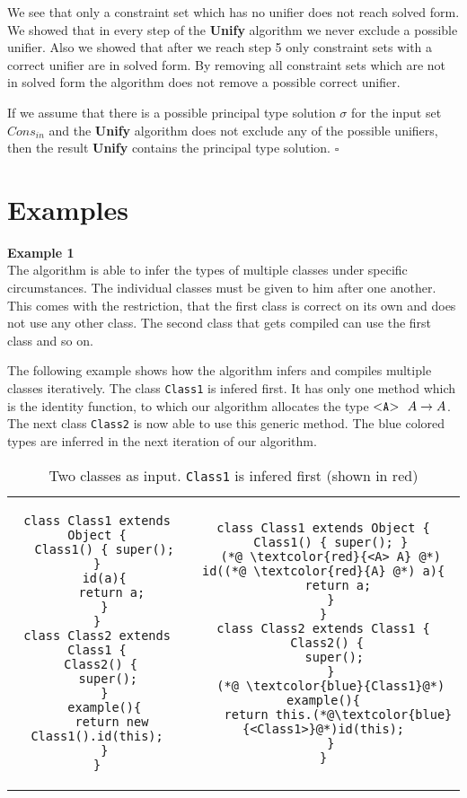 \documentclass[acmsmall,screen,review]{acmart}
\begin{document}
\begin{description}
We see that only a constraint set which has no unifier does not reach solved form.
We showed that in every step of the \textbf{Unify} algorithm we never exclude a possible unifier.
Also we showed that after we reach step 5 only constraint sets with a correct unifier are in solved form.
By removing all constraint sets which are not in solved form the algorithm does not
remove a possible correct unifier.

If we assume that there is a possible principal type solution $\sigma$ for the input set $Cons_{in}$
and the \textbf{Unify} algorithm does not exclude any of the possible unifiers,
then the result \textbf{Unify} contains the principal type solution.
\hfill $\square$
\end{description}

\section{Examples}

\textbf{Example 1}\\
The algorithm is able to infer the types of multiple classes under specific circumstances.
The individual classes must be given to him after one another.
This comes with the restriction, that the first class is correct on its own and does not use any other class.
The second class that gets compiled can use the first class and so on.

The following example shows how the algorithm infers and compiles multiple classes iteratively.
The class \texttt{Class1} is infered first.
It has only one method which is the identity function,
to which our algorithm allocates the type $\mathtt{ {\tt <} A {\tt >} \ }\ A \to A$.
The next class \texttt{Class2} is now able to use this generic method.
The blue colored types are inferred in the next iteration of our algorithm.

\begin{table}
\caption{Two classes as input. \texttt{Class1} is infered first (shown in {\color{red}red})}
\begin{tabular}{cc}
\begin{lstlisting}
class Class1 extends Object {
  Class1() { super(); }
  id(a){
    return a;
  }
}
class Class2 extends Class1 {
  Class2() { 
    super(); 
  }
  example(){
    return new Class1().id(this);
  }
}
\end{lstlisting}
&
\begin{lstlisting}
class Class1 extends Object {
  Class1() { super(); }
  (*@ \textcolor{red}{<A> A} @*) id((*@ \textcolor{red}{A} @*) a){
    return a;
  }
}
class Class2 extends Class1 {
  Class2() { 
    super(); 
  }
  (*@ \textcolor{blue}{Class1}@*) example(){
    return this.(*@\textcolor{blue}{<Class1>}@*)id(this);
  }
}
\end{lstlisting}
\end{tabular}
\end{table}
\end{document}
